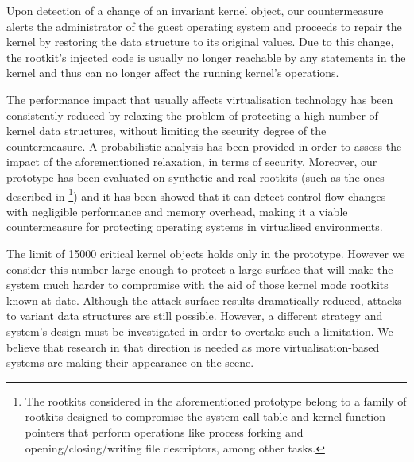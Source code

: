 Upon detection of a change of an invariant kernel object, our countermeasure alerts the administrator of the guest operating system and proceeds to repair the kernel by restoring the data structure to its original values. Due to this change, the rootkit's injected code is usually no longer reachable by any statements in the kernel and thus can no longer affect the running kernel's operations. 

The performance impact that usually affects virtualisation technology has been consistently reduced by relaxing the problem of protecting a high number of kernel data structures, without limiting the security degree of the countermeasure. A probabilistic analysis has been provided in order to assess the impact of the aforementioned relaxation, in terms of security. 
Moreover, our prototype has been evaluated on synthetic and real rootkits (such as the ones described in \cite{kernel_hijack, adoreng}\footnote{The rootkits considered in the aforementioned prototype belong to a family of rootkits designed to compromise the system call table and kernel function pointers that perform operations like process forking and opening/closing/writing file descriptors, among other tasks.}) and it has been showed that it can detect control-flow changes with negligible performance and memory overhead, making it a viable countermeasure for protecting operating systems in virtualised environments.

The limit of 15000 critical kernel objects holds only in the prototype. However we consider this number large enough to protect a large surface that will make the system much harder to compromise with the aid of those kernel mode rootkits known at date. 
Although the attack surface results dramatically reduced, attacks to variant data structures are still possible. However, a different strategy and system's design must be investigated in order to overtake such a limitation. We believe that research in that direction is needed as more virtualisation-based systems are making their appearance on the scene. 

